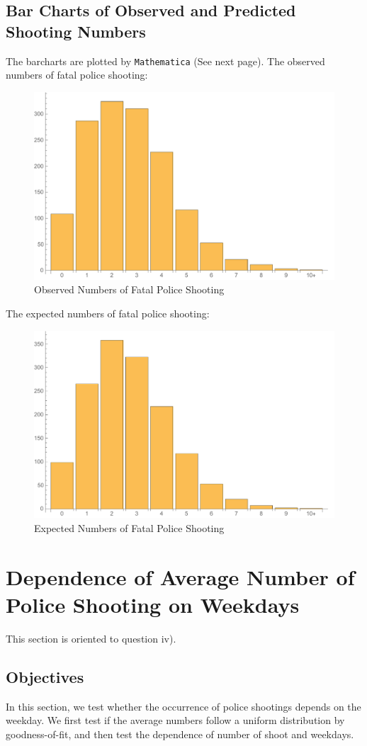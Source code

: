 \documentclass[a4paper]{article}
\begin{document}
\subsection{Bar Charts of Observed and Predicted Shooting Numbers}
The barcharts are plotted by \texttt{Mathematica} (See next page).
\newpage
The observed numbers of fatal police shooting:
\begin{figure}[!htbp]
\centering
\includegraphics[width=0.8\linewidth]{observedbar.pdf}
\caption{Observed Numbers of Fatal Police Shooting}
\end{figure}

The expected numbers of fatal police shooting:
\begin{figure}[!htbp]
\centering
\includegraphics[width=0.8\linewidth]{expectedbar.pdf}
\caption{Expected Numbers of Fatal Police Shooting}
\end{figure}

\newpage

\section{Dependence of Average Number of Police Shooting on Weekdays}
This section is oriented to question iv).
\subsection{Objectives}
In this section, we test whether the occurrence of police shootings depends on the weekday. We first test if the average numbers follow a uniform distribution by goodness-of-fit, and then test the dependence of number of shoot and weekdays.
\end{document}
